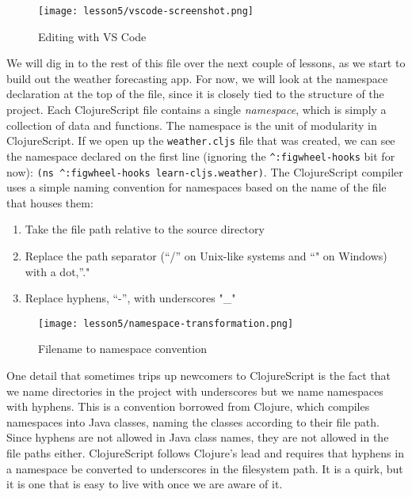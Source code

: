 \documentclass[10pt,twoside,openright]{memoir}
\begin{document}
\begin{figure}[H]
\caption{Editing with VS Code}
\centering
\texttt{[image: lesson5/vscode-screenshot.png]}
\end{figure}

We will dig in to the rest of this file over the next couple of lessons,
as we start to build out the weather forecasting app. For now, we will
look at the namespace declaration at the top of the file, since it is
closely tied to the structure of the project. Each ClojureScript file
contains a single \emph{namespace}, which is simply a collection of data
and functions. The namespace is the unit of modularity in ClojureScript.
If we open up the \texttt{weather.cljs} file that was created, we can
see the namespace declared on the first line (ignoring the
\texttt{\^{}:figwheel-hooks} bit for now):
\texttt{(ns\ \^{}:figwheel-hooks\ learn-cljs.weather)}. The
ClojureScript compiler uses a simple naming convention for namespaces
based on the name of the file that houses them:

\begin{enumerate}
\def\labelenumi{\arabic{enumi}.}
\tightlist
\item
  Take the file path relative to the source directory
\item
  Replace the path separator (``/'' on Unix-like systems and ``" on
  Windows) with a dot,''."
\item
  Replace hyphens, ``-'', with underscores "\_"
\end{enumerate}

\begin{figure}[H]
\caption{Filename to namespace convention}
\centering
\texttt{[image: lesson5/namespace-transformation.png]}
\end{figure}

\begin{notice}[title={Hyphen or Underscore?}]
One detail that sometimes trips up newcomers to ClojureScript is the
fact that we name directories in the project with underscores but we
name namespaces with hyphens. This is a convention borrowed from
Clojure, which compiles namespaces into Java classes, naming the classes
according to their file path. Since hyphens are not allowed in Java
class names, they are not allowed in the file paths either.
ClojureScript follows Clojure's lead and requires that hyphens in a
namespace be converted to underscores in the filesystem path. It is a
quirk, but it is one that is easy to live with once we are aware of it.
\end{notice}
\end{document}
